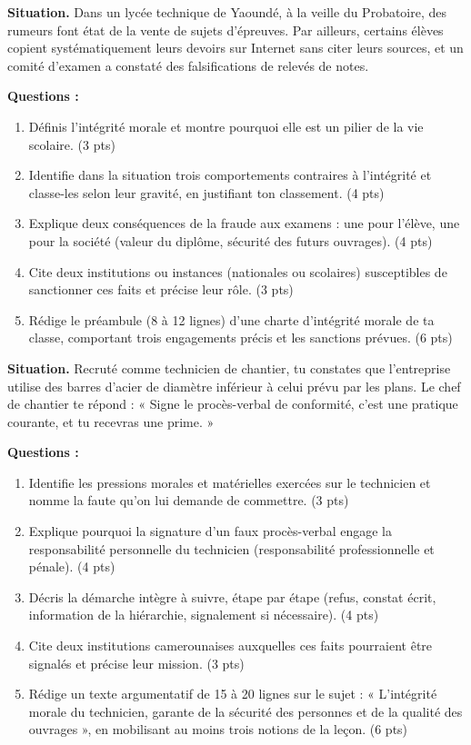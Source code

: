 \documentclass[11pt]{article}
\begin{document}
\begin{exercice}
\textbf{Situation.} Dans un lycée technique de Yaoundé, à la veille du Probatoire, des rumeurs font état de la vente de sujets d'épreuves. Par ailleurs, certains élèves copient systématiquement leurs devoirs sur Internet sans citer leurs sources, et un comité d'examen a constaté des falsifications de relevés de notes.

\textbf{Questions :}
\begin{enumerate}
\item Définis l'intégrité morale et montre pourquoi elle est un pilier de la vie scolaire. (3 pts)
\item Identifie dans la situation trois comportements contraires à l'intégrité et classe-les selon leur gravité, en justifiant ton classement. (4 pts)
\item Explique deux conséquences de la fraude aux examens : une pour l'élève, une pour la société (valeur du diplôme, sécurité des futurs ouvrages). (4 pts)
\item Cite deux institutions ou instances (nationales ou scolaires) susceptibles de sanctionner ces faits et précise leur rôle. (3 pts)
\item Rédige le préambule (8 à 12 lignes) d'une charte d'intégrité morale de ta classe, comportant trois engagements précis et les sanctions prévues. (6 pts)
\end{enumerate}
\end{exercice}

\begin{exercice}
\textbf{Situation.} Recruté comme technicien de chantier, tu constates que l'entreprise utilise des barres d'acier de diamètre inférieur à celui prévu par les plans. Le chef de chantier te répond : « Signe le procès-verbal de conformité, c'est une pratique courante, et tu recevras une prime. »

\textbf{Questions :}
\begin{enumerate}
\item Identifie les pressions morales et matérielles exercées sur le technicien et nomme la faute qu'on lui demande de commettre. (3 pts)
\item Explique pourquoi la signature d'un faux procès-verbal engage la responsabilité personnelle du technicien (responsabilité professionnelle et pénale). (4 pts)
\item Décris la démarche intègre à suivre, étape par étape (refus, constat écrit, information de la hiérarchie, signalement si nécessaire). (4 pts)
\item Cite deux institutions camerounaises auxquelles ces faits pourraient être signalés et précise leur mission. (3 pts)
\item Rédige un texte argumentatif de 15 à 20 lignes sur le sujet : « L'intégrité morale du technicien, garante de la sécurité des personnes et de la qualité des ouvrages », en mobilisant au moins trois notions de la leçon. (6 pts)
\end{enumerate}
\end{exercice}
\end{document}
